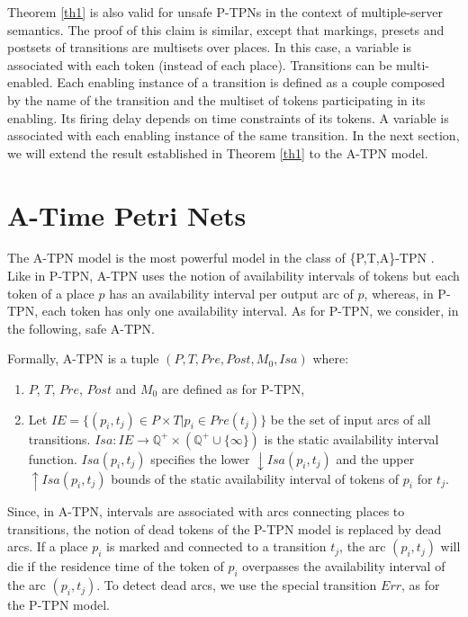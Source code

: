 \documentclass[submission,copyright,creativecommons]{eptcs}
\numberwithin{equation}{section}
\begin{document}
\par Theorem \ref{th1} is also valid for unsafe P-TPNs in the context of multiple-server semantics. The proof of this claim is similar, except that markings, presets and postsets of transitions are multisets over places. In this case, a variable is associated with each token (instead of each place). Transitions can be multi-enabled. Each enabling instance of a transition is defined as a couple composed by the name of the transition and the multiset of tokens participating in its enabling. Its firing delay depends on time constraints of its tokens. A variable is associated with each enabling instance of the same transition. In the next section, we will extend the result established in Theorem \ref{th1} to the A-TPN model.

\section{A-Time Petri Nets}
The A-TPN model is the most powerful model in the class of \{P,T,A\}-TPN \cite{boyer-FI-08}. Like in P-TPN, A-TPN uses the notion of availability intervals of tokens but each token of a place $p$ has an availability interval per output arc of $p$, whereas, in P-TPN, each token has only one availability interval. As for P-TPN, we consider, in the following, safe A-TPN.

\par Formally, A-TPN is a tuple \((P, T, Pre, Post, M_{0}, Isa) \) where: \begin{enumerate} \item \(P\), \(T\), \(Pre\), \(Post\) and \(M_{0}\) are defined as for P-TPN, \item Let $IE=\{(p_i,t_j) \in P \times T  |  p_i \in Pre(t_j)\}$ be the set of input arcs of all transitions. $Isa: IE \rightarrow  \mathbb{Q}^{+}\times(\mathbb{Q}^{+}\cup \{\infty\})$ is the static
availability interval function. \(Isa(p_i,t_j)\) specifies the lower \({\downarrow Isa(p_i,t_j)}\)
and the upper \({\uparrow Isa(p_i,t_j)}\) bounds of the static availability
interval of tokens of $p_i$ for \(t_j\). \end{enumerate}

\par Since, in A-TPN, intervals are associated with arcs connecting places to transitions, the notion of dead tokens of the P-TPN model is replaced by dead arcs. If a place $p_i$ is marked and connected to a transition $t_j$, the arc $(p_i,t_j)$ will die if the residence time of the token of $p_i$ overpasses the availability interval of the arc $(p_i,t_j)$. To detect dead arcs, we use the special transition $Err$, as for the P-TPN model.
\end{document}
